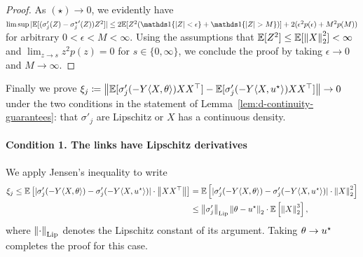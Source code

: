 \begin{proof}
  As $(\star) \to 0$, we evidently have
  $\limsup |\E[(\sigma_j'(Z) - {\sigma_j\opt}'(Z)) Z^2]|
  \le 2 \E[Z^2 (\ind\{|Z| < \epsilon\} + \ind\{|Z| > M\})]
  + 2 (\epsilon^2 p(\epsilon) + M^2 p(M))$ for arbitrary
  $0 < \epsilon < M < \infty$.
  Using the assumptions that $\mathbb{E}[Z^2] \leq \mathbb{E}[\left\|{X}\right\|_2^2] < \infty$
  and $\lim_{z \to s} z^2p(z) = 0$ for $s \in \{0, \infty\}$, we
  conclude the proof by taking $\epsilon \to 0$ and $M \to \infty$.
\end{proof}

Finally we prove $\xi_j \coloneqq \left\|{\mathbb{E}[\sigma_j'(-Y\langle X, \theta\rangle) XX^\top]
  - \mathbb{E}[\sigma_j'(-Y\langle X, u^\star\rangle) XX^\top]}\right\| \to 0$ under the two conditions
in the statement of Lemma~\ref{lem:d-continuity-guarantees}: that
$\sigma'_j$ are Lipschitz or $X$ has a continuous density.
\paragraph{Condition 1. The links have Lipschitz derivatives}
We apply Jensen's inequality to write
\begin{align*}
  \xi_j \leq \mathbb{E}\left[|\sigma_j'(-Y\langle X, \theta\rangle) - \sigma_j'(-Y\langle X, u^\star\rangle)| \cdot \left\|{XX^\top}\right\|\right]
  & = \mathbb{E}\left[|\sigma_j'(-Y\langle X, \theta\rangle) - \sigma_j'(-Y\langle X, u^\star\rangle)| \cdot \left\|{X}\right\|_2^2\right] \\
  & \le \left\|{\sigma_j'}\right\|_{\textup{Lip}}
  \left\|{\theta - u^\star}\right\|_2 \cdot \mathbb{E}\left[\left\|{X}\right\|_2^3\right],
\end{align*}
where $\left\|{\cdot}\right\|_{\textup{Lip}}$ denotes the Lipschitz
constant of its argument. Taking
$\theta \to u^\star$ completes the proof for this case.
